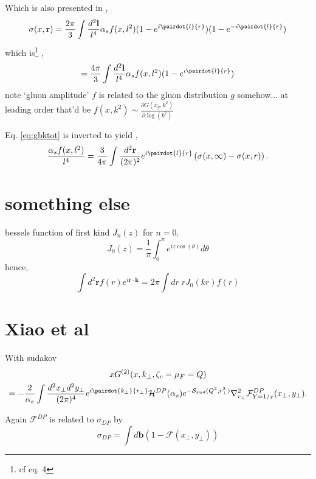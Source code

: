 Which is also presented in \cite{gbk2002},
\begin{equation}
\sigma(x,\mathbf{r})=\frac{2\pi}{3}\int\frac{d^2 \mathbf{l}}{l^4}\alpha_s f(x,l^2) (1-e^{i \pairdot{l}{r}})(1-e^{-i \pairdot{l}{r}})
\end{equation}
which is\footnote{ cf \cite{ivanov2002} eq. 4} ,
\begin{equation}
=\frac{4\pi}{3}\int\frac{d^2 \mathbf{l}}{l^4}\alpha_s f(x,l^2) (1-e^{i \pairdot{l}{r}})
\label{eq:gbktot}
\end{equation}
note `gluon amplitude' $f$ is related to  the gluon distribution $g$ somehow... 
at leading order that'd be $f(x,k^2)\sim  \frac{\partial G(x_g,k^2)}{\partial \log(k^2)}$ 


Eq. \ref{eq:gbktot} is inverted to yield \cite{gbk2002},
\begin{equation}
\frac{ \alpha_s f(x,l^2)}{l^4}=\frac{3}{4\pi} \int\frac{d^2 \mathbf{r}}{(2\pi)^2} e^{i\pairdot{l}{r}}\left(\sigma(x,\infty)-\sigma(x,r)\right).
\end{equation}

\section{something else}
bessels function of first kind $J_n(z)$ for $n=0$.
\begin{equation}
J_0(z)=\frac{1}{\pi}\int^\pi_0 e^{i z \cos(\theta)}d\theta
\end{equation}
hence,
\begin{equation}
\int d^2\mathbf{r} f(r) e^{i \mathbf{r}\cdot \mathbf{k}}=2\pi \int dr \;r J_0(kr) f(r)
\end{equation}



\section{Xiao et al \cite{xiao2017}}
With sudakov
\begin{multline}
xG^{(2)}(x,k_{\perp},\zeta_c=\mu_F=Q)\\
=- \frac{2}{\alpha_s}\int\frac{d^2x_\perp d^2 y_\perp}{(2 \pi)^4} e^{i \pairdot{k_\perp}{r_\perp}}\mathcal{H}^{DP}(\alpha_s)e^{-\mathcal{S}_{sud}(Q^2,r^2_\perp)}
\mathbf{\nabla}^2_{r_\perp}\mathcal{F}^{DP}_{Y=1/x}(x_\perp, y_\perp).
\end{multline}

Again $\mathcal{F}^{DP}$ is related to $\sigma_{DP}$ by 
\begin{equation}
\sigma_{DP}=\int d\mathbf{b}(1-\mathcal{F}(x_\perp,y_\perp))
\end{equation} 
